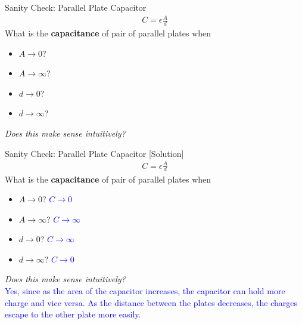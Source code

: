 \begin{frame}{Sanity Check: Parallel Plate Capacitor}
    \begin{align*}
        C = \epsilon \frac{A}{d}
    \end{align*}
    What is the \textbf{capacitance} of pair of parallel plates when 
    \begin{itemize}
        \item $A \to 0$?
        \item $A \to \infty$?
        \item $d \to 0$?
        \item $d \to \infty$? \\[10pt]
    \end{itemize}
    \textit{Does this make sense intuitively?}
\end{frame}

\begin{frame}{Sanity Check: Parallel Plate Capacitor [Solution]}
    \begin{align*}
        C = \epsilon \frac{A}{d}
    \end{align*}
    What is the \textbf{capacitance} of pair of parallel plates when 
    \begin{itemize}
        \item $A \to 0$? \textcolor{blue}{$C \to 0$}
        \item $A \to \infty$? \textcolor{blue}{$C \to \infty$}
        \item $d \to 0$? \textcolor{blue}{$C \to \infty$}
        \item $d \to \infty$? \textcolor{blue}{$C \to 0$}\\[10pt]
    \end{itemize}
    \textit{Does this make sense intuitively?} \\
    \textcolor{blue}{
        Yes, since as the area of the capacitor increases, the capacitor can hold more charge and vice versa. As the distance between the plates decreases, the charges escape to the other plate more easily.
    }
\end{frame}


